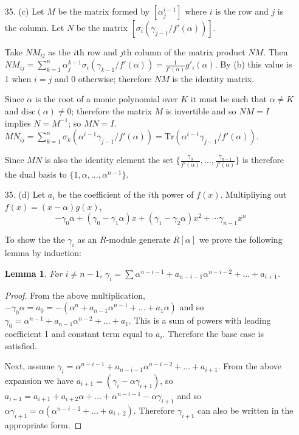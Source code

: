 \documentclass{article}
\newcommand{\trace}[1]{\text{Tr}(#1)}
\newcommand{\disc}[1]{\text{disc}(#1)}
\newtheorem{lemma}{Lemma}
\begin{document}
\begin{enumerate}
\item[35. (c)] Let $M$ be the matrix formed by $[ \alpha_j^{i-1}]$ where $i$ is the row and $j$ is the column.  Let $N$ be the matrix $[\sigma_i(\gamma_{j - 1}/f'(\alpha))]$.

Take $NM_{ij}$ as the $i$th row and $j$th column of the matrix product $NM$.  Then $NM_{ij} = \sum^{n}_{k = 1} \alpha_{j}^{k - 1} \sigma_i(\gamma_{k - 1} / f'(\alpha)) = \frac{1}{f'(\alpha)} g'_i(\alpha)$.  By (b) this value is 1 when $i = j$ and 0 otherwise; therefore $NM$ is the identity matrix.

Since $\alpha$ is the root of a monic polynomial over $K$ it must be such that $\alpha \neq K$ and $\disc{\alpha} \neq 0$; therefore the matrix $M$ is invertible and so $NM = I$ implies $N = M^{-1}$; so $MN = I$.  $MN_{ij} = \sum_{k = 1}^{n} \sigma_{k}(\alpha^{i - 1}\gamma_{j - 1}/f'(\alpha)) = \trace{\alpha^{i-1}\gamma_{j - 1}/f'(\alpha)}$.

Since $MN$ is also the identity element the set $\{ \frac{\gamma_{0}}{f'(\alpha)}, \ldots, \frac{\gamma_{n - 1}}{f'(\alpha)} \}$ is therefore the dual basis to $\{ 1, \alpha, \ldots, \alpha^{n-1} \}$.

\item[35. (d)]
Let $a_i$ be the coefficient of the $i$th power of $f(x)$.  Multipliying out $f(x) = (x - \alpha)g(x)$, \[ -\gamma_0\alpha + (\gamma_0 - \gamma_1 \alpha)x + (\gamma_1 - \gamma_2 \alpha)x^2 + \cdots \gamma_{n-1}x^n \]

To show the the $\gamma_i$ as an $R$-module generate $R[\alpha]$ we prove the following lemma by induction:

\begin{lemma}
     For $i \neq n - 1$, $\gamma_i = \sum \alpha^{n - i - 1} + a_{n - i - 1} \alpha^{n - i - 2} + \ldots + a_{i + 1}$.
\end{lemma}
\begin{proof}
From the above multiplication, $-\gamma_0\alpha = a_0 = -(\alpha^n + a_{n-1} \alpha^{n-1} + \ldots + a_1 \alpha)$ and so $\gamma_0 = \alpha^{n-1} + a_{n-1} \alpha^{n-2} + \ldots + a_1$.  This is a sum of powers with leading coefficient 1 and constant term equal to $a_{i}$.  Therefore the base case is satisfied.

Next, assume $\gamma_i = \alpha^{n - i - 1} + a_{n - i - 1}\alpha^{n - i - 2} + \ldots + a_{i + 1}$. From the above expansion we have $a_{i + 1} = (\gamma_{i} - \alpha\gamma_{i + 1})$, so $a_{i + 1} = a_{i + 1} + a_{i + 2}\alpha + \ldots + \alpha^{n - i - 1} - \alpha\gamma_{i + 1}$ and so $\alpha\gamma_{i + 1} = \alpha(\alpha^{n - i - 2} + \ldots + a_{i + 2})$.  Therefore $\gamma_{i + 1}$ can also be written in the appropriate form.
\end{proof}


\end{enumerate}
\end{document}
